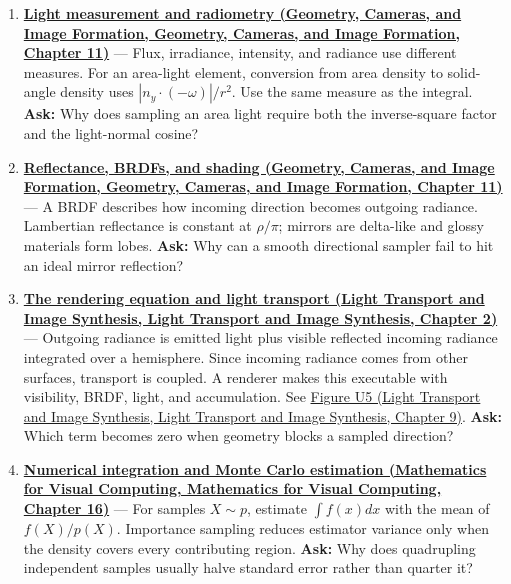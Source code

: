 \begin{enumerate}
\item
  \textbf{\href{../03-Geometry-Cameras-and-Image-Formation/main.pdf\#nameddest=03-visual-computing-i-ch004-light-measurement-and-radiometry}{Light measurement and radiometry (Geometry, Cameras, and Image Formation, Geometry, Cameras, and Image Formation, Chapter 11)}} --- Flux, irradiance, intensity, and radiance use different measures. For an area-light element, conversion from area density to solid-angle density uses \(|n_y\cdot(-\omega)|/r^2\). Use the same measure as the integral. \textbf{Ask:} Why does sampling an area light require both the inverse-square factor and the light-normal cosine?
\item
  \textbf{\href{../03-Geometry-Cameras-and-Image-Formation/main.pdf\#nameddest=03-visual-computing-i-ch004-reflectance-brdfs-and-shading}{Reflectance, BRDFs, and shading (Geometry, Cameras, and Image Formation, Geometry, Cameras, and Image Formation, Chapter 11)}} --- A BRDF describes how incoming direction becomes outgoing radiance. Lambertian reflectance is constant at \(\rho/\pi\); mirrors are delta-like and glossy materials form lobes. \textbf{Ask:} Why can a smooth directional sampler fail to hit an ideal mirror reflection?
\item
  \textbf{\href{../04-Light-Transport-and-Image-Synthesis/main.pdf\#nameddest=03-visual-computing-i-ch007-the-rendering-equation-and-light-transport}{The rendering equation and light transport (Light Transport and Image Synthesis, Light Transport and Image Synthesis, Chapter 2)}} --- Outgoing radiance is emitted light plus visible reflected incoming radiance integrated over a hemisphere. Since incoming radiance comes from other surfaces, transport is coupled. A renderer makes this executable with visibility, BRDF, light, and accumulation. See \href{../04-Light-Transport-and-Image-Synthesis/main.pdf\#nameddest=04-visual-computing-ii-ch035-figure-u5---a-direct-light-renderer-makes-the-pipeline-executable}{Figure U5 (Light Transport and Image Synthesis, Light Transport and Image Synthesis, Chapter 9)}. \textbf{Ask:} Which term becomes zero when geometry blocks a sampled direction?
\item
  \textbf{\href{../02-Mathematics-for-Visual-Computing/main.pdf\#nameddest=03-visual-computing-i-ch012-numerical-integration-and-monte-carlo-estimation}{Numerical integration and Monte Carlo estimation (Mathematics for Visual Computing, Mathematics for Visual Computing, Chapter 16)}} --- For samples \(X\sim p\), estimate \(\int f(x)dx\) with the mean of \(f(X)/p(X)\). Importance sampling reduces estimator variance only when the density covers every contributing region. \textbf{Ask:} Why does quadrupling independent samples usually halve standard error rather than quarter it?

\end{enumerate}
